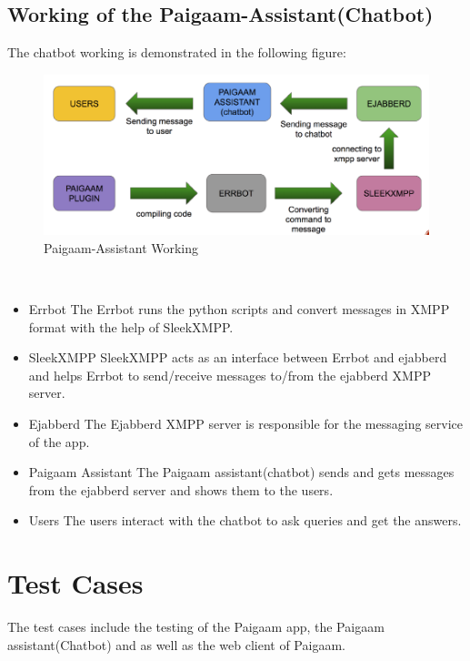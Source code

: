 \subsection{Working of the Paigaam-Assistant(Chatbot)}
The chatbot working is demonstrated in the following figure:
\begin{figure}[ht]
\centering
\includegraphics[scale=0.3]{input/images/aeb.png}
\caption{Paigaam-Assistant Working}
\end{figure}\\
\begin{itemize}
\item Errbot
The Errbot runs the python scripts and convert messages in XMPP format with the help of SleekXMPP.
\item SleekXMPP
SleekXMPP acts as an interface between Errbot and ejabberd and helps Errbot to send/receive messages
to/from the ejabberd XMPP server.
\item Ejabberd
The Ejabberd XMPP server is responsible for the messaging service of the app.
\item Paigaam Assistant
The Paigaam assistant(chatbot) sends and gets messages from the ejabberd server and shows them to the
users.
\item Users
The users interact with the chatbot to ask queries and get the answers.
\end{itemize}
\section{Test Cases}
The test cases include the testing of the Paigaam app, the Paigaam assistant(Chatbot) and as well as the
web client of Paigaam.
